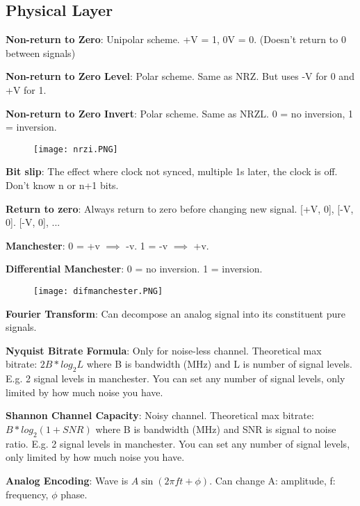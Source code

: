 \documentclass[a4paper,landscape]{article}
\newcommand{\rntopic}[1]{\vspace{-2.0em}\subsection*{#1}\vspace{-1.0em}}
\newcommand{\rnname}[1]{\textbf{#1}}
\begin{document}
\begin{multicols*}{4}
\begin{flatitemize}
\end{flatitemize}
\rntopic{Physical Layer}
\begin{flatitemize}
\item \rnname{Non-return to Zero}: Unipolar scheme. +V = 1, 0V = 0. (Doesn't return to 0 between signals)
\item \rnname{Non-return to Zero Level}: Polar scheme. Same as NRZ. But uses -V for 0 and +V for 1.
\item \rnname{Non-return to Zero Invert}: Polar scheme. Same as NRZL. 0 = no inversion, 1 = inversion.
\vspace{-0.3cm}
    \begin{figure}[H]
      \texttt{[image: nrzi.PNG]}
    \end{figure}
\vspace{-0.4cm}
\item \rnname{Bit slip}: The effect where clock not synced, multiple 1s later, the clock is off. Don't know n or n+1 bits.
\item \rnname{Return to zero}: Always return to zero before changing new signal. [+V, 0], [-V, 0]. [-V, 0], ...
\item \rnname{Manchester}: 0 = +v $\implies$ -v. 1 = -v $\implies$ +v.
\item \rnname{Differential Manchester}: 0 = no inversion. 1 = inversion.
\vspace{-0.3cm}
    \begin{figure}[H]
      \texttt{[image: difmanchester.PNG]}
    \end{figure}
\vspace{-0.4cm}
\item \rnname{Fourier Transform}: Can decompose an analog signal into its constituent pure signals.
\item \rnname{Nyquist Bitrate Formula}: Only for noise-less channel. Theoretical max bitrate: $2B * log_{2}L$ where B is bandwidth (MHz) and L is number of signal levels. E.g. 2 signal levels in manchester. You can set any number of signal levels, only limited by how much noise you have.
\item \rnname{Shannon Channel Capacity}: Noisy channel. Theoretical max bitrate: $B * log_{2}(1+SNR)$ where B is bandwidth (MHz) and SNR is signal to noise ratio. E.g. 2 signal levels in manchester. You can set any number of signal levels, only limited by how much noise you have.
\item \rnname{Analog Encoding}: Wave is $A \sin (2\pi f t + \phi)$. Can change A: amplitude, f: frequency, $\phi$ phase.

\end{flatitemize}
\end{multicols*}
\end{document}
